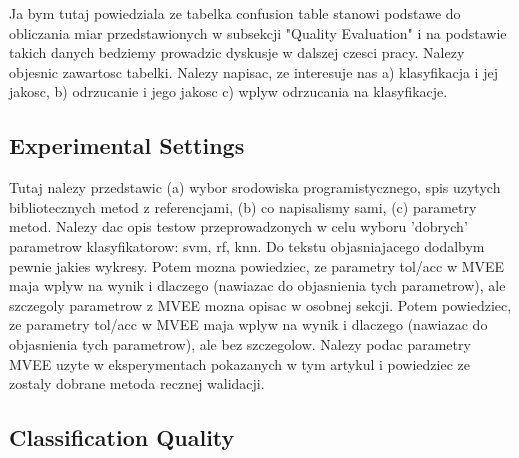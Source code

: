 \documentclass{llncs}
\begin{document}
{\color{blue}Ja bym tutaj powiedziala ze tabelka confusion table stanowi podstawe do obliczania miar przedstawionych w subsekcji "Quality Evaluation" i na podstawie takich danych bedziemy prowadzic dyskusje w dalszej czesci pracy.  Nalezy objesnic zawartosc tabelki. Nalezy napisac, ze interesuje nas a) klasyfikacja i jej jakosc, b) odrzucanie i jego jakosc c) wplyw odrzucania na klasyfikacje. }


\subsection{Experimental Settings}

{\color{red}Tutaj nalezy przedstawic (a) wybor srodowiska programistycznego, spis uzytych bibliotecznych metod z referencjami, (b) co napisalismy sami, (c) parametry metod. Nalezy dac opis testow przeprowadzonych w celu wyboru 'dobrych' parametrow klasyfikatorow: svm, rf, knn. Do tekstu objasniajacego dodalbym pewnie jakies wykresy. Potem mozna powiedziec, ze parametry tol/acc w MVEE maja wplyw na wynik i dlaczego (nawiazac do objasnienia tych parametrow), ale szczegoly parametrow z MVEE mozna opisac w osobnej sekcji.}
{\color{blue} Potem powiedziec, ze parametry tol/acc w MVEE maja wplyw na wynik i dlaczego (nawiazac do objasnienia tych parametrow), ale bez szczegolow. Nalezy podac parametry MVEE uzyte w eksperymentach pokazanych w tym artykul i powiedziec ze zostaly dobrane metoda recznej walidacji.}

\subsection{Classification Quality}

\end{document}
